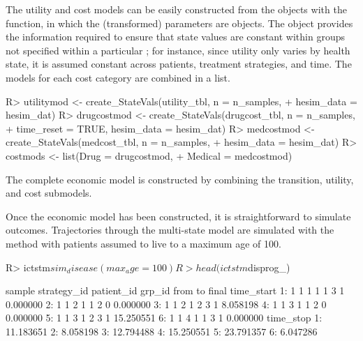 \documentclass[article, nojss]{jss}\usepackage[]{graphicx}\usepackage[]{color}
\begin{document}
The utility and cost models can be easily constructed from the  objects with the  function, in which the (transformed) parameters are  objects. The  object provides the information required to ensure that state values are constant within groups not specified within a particular ; for instance, since utility only varies by health state, it is assumed constant across patients, treatment strategies, and time. The models for each cost category are combined in a list.
  
\begin{Schunk}
\begin{Sinput}
R> utilitymod <- create_StateVals(utility_tbl, n = n_samples, 
+                                 hesim_data = hesim_dat)
R> drugcostmod <- create_StateVals(drugcost_tbl, n = n_samples,
+                                  time_reset = TRUE, hesim_data = hesim_dat)
R> medcostmod <- create_StateVals(medcost_tbl, n = n_samples,
+                                 hesim_data = hesim_dat)
R> costmods <- list(Drug = drugcostmod,
+                   Medical = medcostmod)
\end{Sinput}
\end{Schunk}

The complete economic model is constructed by combining the transition, utility, and cost submodels.

\begin{Schunk}
\end{Schunk}

Once the economic model has been constructed, it is straightforward to simulate outcomes. Trajectories through the multi-state model are simulated with the  method with patients assumed to live to a maximum age of 100.

\begin{Schunk}
\begin{Sinput}
R> ictstm$sim_disease(max_age = 100)
R> head(ictstm$disprog_)
\end{Sinput}
\begin{Soutput}
   sample strategy_id patient_id grp_id from to final time_start
1:      1           1          1      1    1  3     1   0.000000
2:      1           1          2      1    1  2     0   0.000000
3:      1           1          2      1    2  3     1   8.058198
4:      1           1          3      1    1  2     0   0.000000
5:      1           1          3      1    2  3     1  15.250551
6:      1           1          4      1    1  3     1   0.000000
   time_stop
1: 11.183651
2:  8.058198
3: 12.794488
4: 15.250551
5: 23.791357
6:  6.047286
\end{Soutput}
\end{Schunk}
\end{document}
